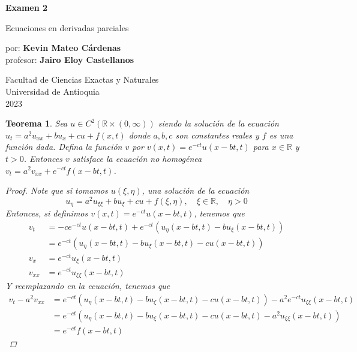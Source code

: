 \documentclass{article}
\theoremstyle{plain}
\newtheorem{teo}[proposición]{Teorema}
\theoremstyle{definition}
\begin{document}
\begin{titlepage}
    \begin{center}
        \vspace*{1cm}
        
        \Huge
        \textbf{Examen 2}
        
        \vspace{0.5cm}
        \LARGE
        Ecuaciones en derivadas parciales
        
        \vspace{1.5cm}
        
        por: \textbf{Kevin Mateo Cárdenas}\\
        profesor: \textbf{Jairo Eloy Castellanos}
        \vfill
        
        \vspace{0.8cm}
        
        \Large
        Facultad de Ciencias Exactas y Naturales\\
        Universidad de Antioquia\\
        2023
    \end{center}
\end{titlepage}
\date{24 de octubre 2023}
\begin{teo}
    Sea \( u \in C^2(\mathbb{R} \times (0, \infty)) \) siendo la solución de la ecuación \( u_t = a^2 u_{xx} + bu_x + cu + f(x, t) \) donde \( a, b, c \) son constantes reales y \( f \) es una función dada. Defina la función \( v \) por \( v(x, t) = e^{-ct} u(x - bt, t) \) para \( x \in \mathbb{R} \) y \( t > 0 \). Entonces \( v \) satisface la ecuación no homogénea \( v_t = a^2 v_{xx} + e^{-ct} f(x-bt, t) \).
    
    \begin{proof}
        Note que si tomamos \(u(\xi,\eta)\), una solución de la ecuación
        \[
            u_\eta = a^2 u_{\xi\xi} + bu_\xi + cu + f(\xi, \eta), \quad \xi \in \mathbb{R}, \quad \eta > 0
        \]
        Entonces, si definimos \(v(x, t) = e^{-ct} u(x - bt, t)\), tenemos que
        \begin{align*}
            v_t &= -ce^{-ct} u(x - bt, t) + e^{-ct} (u_\eta(x - bt, t) - bu_\xi(x - bt, t)) \\
            &= e^{-ct} (u_\eta(x - bt, t) - bu_\xi(x - bt, t) - cu(x - bt, t)) \\
            v_x &= e^{-ct} u_\xi(x - bt, t) \\
            v_{xx} &= e^{-ct} u_{\xi\xi}(x - bt, t)
        \end{align*}
        Y reemplazando en la ecuación, tenemos que
        \begin{align*}
            v_t- a^2 v_{xx} &= e^{-ct} (u_\eta(x - bt, t) - bu_\xi(x - bt, t) - cu(x - bt, t)) - a^2 e^{-ct} u_{\xi\xi}(x - bt, t) \\
            &= e^{-ct} (u_\eta(x - bt, t) - bu_\xi(x - bt, t) - cu(x - bt, t) - a^2 u_{\xi\xi}(x - bt, t)) \\
            &= e^{-ct} f(x - bt, t)
        \end{align*}
    \end{proof}
\end{teo}
\end{document}
